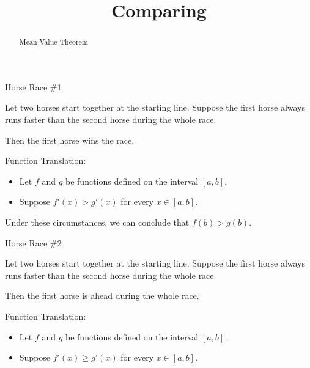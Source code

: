 \documentclass{ximera}
\title{Comparing}
\begin{document}
\begin{abstract}
Mean Value Theorem
\end{abstract}
\maketitle






\begin{idea} Horse Race \#1


Let two horses start together at the starting line. Suppose the first horse always runs faster than the second horse during the whole race.

Then the first horse wins the race.


\end{idea}





Function Translation:

\begin{itemize}
\item Let $f$ and $g$ be functions defined on the interval $[a, b]$. 
\item Suppose $f'(x) > g'(x)$ for every $x \in [a,b]$. 
\end{itemize}

Under these circumstances, we can conclude that $f(b) > g(b)$.













\begin{idea} Horse Race \#2


Let two horses start together at the starting line. Suppose the first horse always runs faster than the second horse during the whole race.

Then the first horse is ahead during the whole race.


\end{idea}





Function Translation:

\begin{itemize}
\item Let $f$ and $g$ be functions defined on the interval $[a, b]$. 
\item Suppose $f'(x) \geq g'(x)$ for every $x \in [a,b]$. 
\end{itemize}
\end{document}
